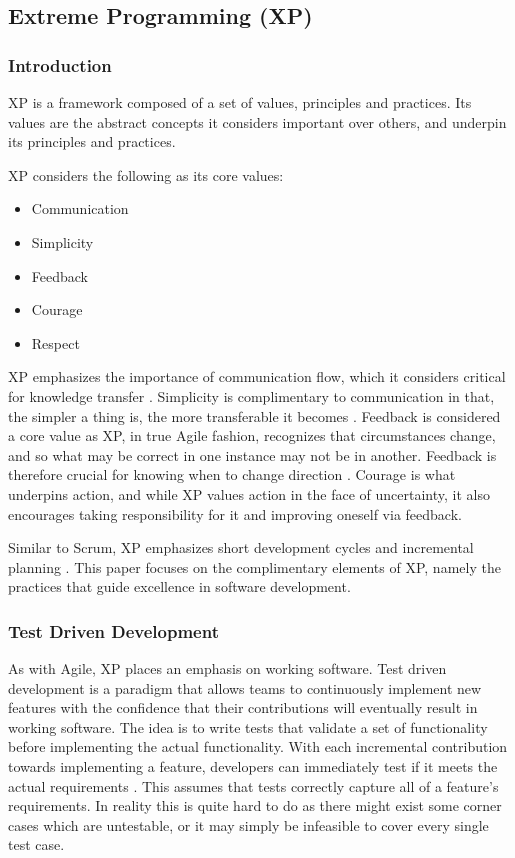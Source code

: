 \documentclass[11pt]{article}
\begin{document}
    \subsection{Extreme Programming (XP)}
        \subsubsection{Introduction}
        XP is a framework composed of a set of values, principles and practices. Its values are the abstract concepts it considers important over others, and underpin its principles and practices.

        XP considers the following as its core values:
            \begin{itemize}
                \item Communication
                \item Simplicity
                \item Feedback
                \item Courage
                \item Respect
            \end{itemize}

        XP emphasizes the importance of communication flow, which it considers critical for knowledge transfer \citet{beck2000extreme}. Simplicity is complimentary to communication in that, the simpler a thing is, the more transferable it becomes \citet{beck2000extreme}. Feedback is considered a core value as XP, in true Agile fashion, recognizes that circumstances change, and so what may be correct in one instance may not be in another. Feedback is therefore crucial for knowing when to change direction \citet{beck2000extreme}. Courage is what underpins action, and while XP values action in the face of uncertainty, it also encourages taking responsibility for it and improving oneself via feedback.

        Similar to Scrum, XP emphasizes short development cycles and incremental planning \citet{beck2000extreme}. This paper focuses on the complimentary elements of XP, namely the practices that guide excellence in software development.
      
        \subsubsection{Test Driven Development}
        As with Agile, XP places an emphasis on working software. Test driven development is a paradigm that allows teams to continuously implement new features with the confidence that their contributions will eventually result in working software. The idea is to write tests that validate a set of functionality before implementing the actual functionality. With each incremental contribution towards implementing a feature, developers can immediately test if it meets the actual requirements \citet{sethi}. This assumes that tests correctly capture all of a feature's requirements. In reality this is quite hard to do as there might exist some corner cases which are untestable, or it may simply be infeasible to cover every single test case. 
\end{document}

